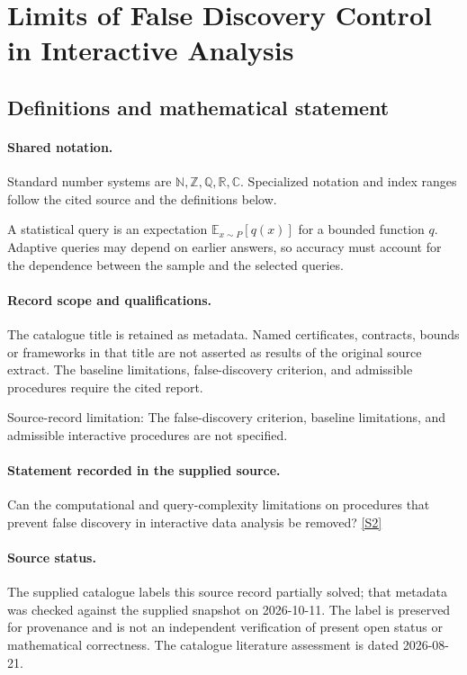 \documentclass[11pt]{article}
\newcommand{\sref}[2]{\hyperlink{source:#1:#2}{[S#2]}}
\begin{document}
\section{Limits of False Discovery Control in Interactive Analysis}\label{statement}

\subsection{Definitions and mathematical statement}

\paragraph{Shared notation.}Standard number systems are $\mathbb N,\mathbb Z,\mathbb Q,\mathbb R,\mathbb C$. Specialized notation and index ranges follow the cited source and the definitions below.


A statistical query is an expectation $\mathbb E_{x\sim P}[q(x)]$ for a bounded function $q$. Adaptive queries may depend on earlier answers, so accuracy must account for the dependence between the sample and the selected queries.
\paragraph{Record scope and qualifications.}
The catalogue title is retained as metadata. Named certificates, contracts, bounds or frameworks in that title are not asserted as results of the original source extract.
The baseline limitations, false-discovery criterion, and admissible procedures require the cited report.

Source-record limitation: The false-discovery criterion, baseline limitations, and admissible interactive procedures are not specified.
\paragraph{Statement recorded in the supplied source.}
Can the computational and query-complexity limitations on procedures that prevent false discovery in interactive data analysis be removed? \sref{statement}{2}
\paragraph{Source status.}
The supplied catalogue labels this source record partially solved; that metadata was checked against the supplied snapshot on 2026-10-11. The label is preserved for provenance and is not an independent verification of present open status or mathematical correctness. The catalogue literature assessment is dated 2026-08-21.
\end{document}
